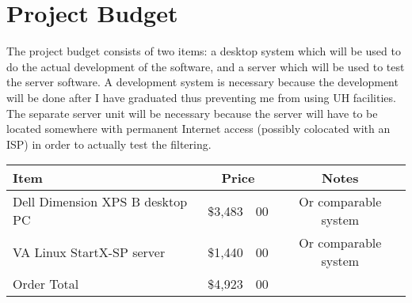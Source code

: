 
\section{Project Budget}

The project budget consists of two items: a desktop system which will be
used to do the actual development of the software, and a server which will be
used to test the server software. A development system is necessary because the
development will be done after I have graduated thus preventing me from using
UH facilities. The separate server unit will be necessary because the server
will have to be located somewhere with permanent Internet access (possibly
colocated with an ISP) in order to actually test the filtering.

\vspace{1 in}

\begin{table}[htb]
  \begin{center}
    \begin{tabular}{lr@{.}lc}
      Item & \multicolumn{2}{c}{Price} & Notes\\ \hline
      Dell Dimension XPS B desktop PC & \$3,483 & 00 & Or comparable system\\
      VA Linux StartX-SP server & \$1,440 & 00 & Or comparable system\\ \hline
      Order Total & \$4,923 & 00 &\\
    \end{tabular}
  \end{center}
\end{table}
